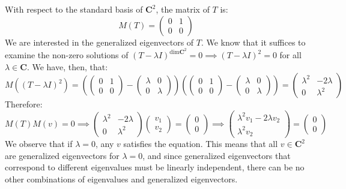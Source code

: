 \begin{solution}
     With respect to the standard basis of $\mathbf{C}^2$, the matrix of $T$ is:
     $$M(T) = \begin{pmatrix}
         0 & 1 \\ 0 & 0
     \end{pmatrix}$$
     We are interested in the generalized eigenvectors of $T$. We know that it suffices to examine the non-zero solutions of $(T - \lambda I)^{\text{dim} \mathbf{C}^2} = 0 \implies (T - \lambda I)^2 = 0$ for all $\lambda \in \mathbf{C}$. We have, then, that:
     $$M((T - \lambda I)^2) = \left( \begin{pmatrix}
         0 & 1 \\ 0 & 0 \end{pmatrix} - \begin{pmatrix}
             \lambda & 0 \\ 0 & \lambda \end{pmatrix} \right) \left( \begin{pmatrix}
         0 & 1 \\ 0 & 0 \end{pmatrix} - \begin{pmatrix}
             \lambda & 0 \\ 0 & \lambda \end{pmatrix} \right) =  \begin{pmatrix}
                 \lambda^2 & -2\lambda \\ 0 & \lambda^2
             \end{pmatrix}$$
    Therefore:
    $$M(T)M(v) = 0 \implies \begin{pmatrix} \lambda^2 & -2\lambda \\ 0 & \lambda^2 \end{pmatrix} \begin{pmatrix}
        v_1 \\ v_2 \end{pmatrix} = \begin{pmatrix}
            0 \\ 0 \end{pmatrix} \implies \begin{pmatrix}
                \lambda^2v_1 - 2\lambda v_2 \\ \lambda^2 v_2
            \end{pmatrix} = \begin{pmatrix} 0 \\ 0 \end{pmatrix}$$
    We observe that if $\lambda = 0$, any $v$ satisfies the equation. This means that all $v \in \mathbf{C}^2$ are generalized eigenvectors for $\lambda = 0$, and since generalized eigenvectors that correspond to different eigenvalues must be linearly independent, there can be no other combinations of eigenvalues and generalized eigenvectors.
 \end{solution}

